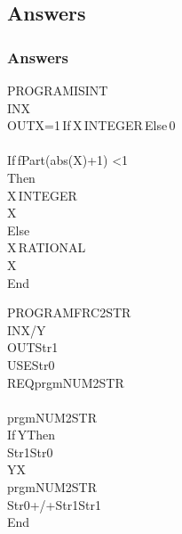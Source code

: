 \subsection{Answers}


\begin{frame}
\frametitle{Answers}

\begin{ticalc}[4.5cm]
	PROGRAM\:\theta ISINT\\%
	\:\qt IN\:X\\%
	\:\qt OUT\:X=1\,If\,X\,INTEGER\,Else\,0\\%
	\:\\%
	\:If\,fPart(abs(X)+1\E{}) <1\E{}\\%
	\:Then\\%
	\:\qt X\,INTEGER\\%
	\>X\\%
	\:Else\\%
	\:\qt X\,RATIONAL\\%
	\>X\\%
	\:End
\end{ticalc}
\begin{ticalc}[4.5cm]
	PROGRAM\:\theta FRC2STR\\%
	\:\qt IN\:X/Y\\%
	\:\qt OUT\:Str1\\%
	\:\qt USE\:Str0\\%
	\:\qt REQ\:prgm\theta NUM2STR\\%
	\:\\%
	\:prgm\theta NUM2STR\\%
	\:If\,Y\:Then\\%
	\:Str1\>Str0\\%
	\:Y\>X\\%
	\:prgm\theta NUM2STR\\%
	\:Str0+\qt/\qt+Str1\>Str1\\%
	\:End
\end{ticalc}

\end{frame}


